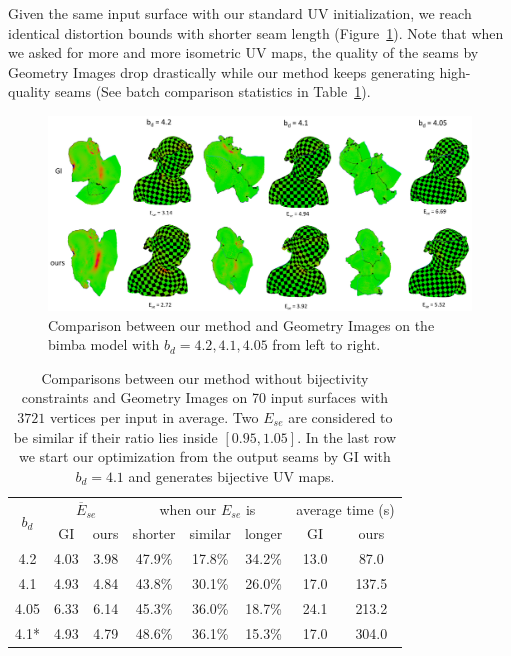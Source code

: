 Given the same input surface with our standard UV initialization, we reach identical distortion bounds with shorter seam length (Figure~\ref{fig:comp_GI}). Note that when we asked for more and more isometric UV maps, the quality of the seams by Geometry Images drop drastically while our method keeps generating high-quality seams (See batch comparison statistics in Table~\ref{tb:comp_GI}).

\begin{figure}[!h]
\centering
\includegraphics[width=\linewidth]{fig/comp_GI.png}
\caption{Comparison between our method and Geometry Images on the bimba model with $b_d = 4.2, 4.1, 4.05$ from left to right.}
\label{fig:comp_GI}
\end{figure}

\begin{table}[!h]
\centering
\caption{Comparisons between our method without bijectivity constraints and Geometry Images on 70 input surfaces with $3721$ vertices per input in average. Two $E_{se}$ are considered to be similar if their ratio lies inside $[0.95, 1.05]$. In the last row we start our optimization from the output seams by GI with $b_d = 4.1$ and generates bijective UV maps.} 
\label{tb:comp_GI}
\begin{tabular}{@{}cccccccc@{}}
\toprule
\multirow{2}{*}{$b_d$} & \multicolumn{2}{c}{$\overline{E}_{se}$}             & \multicolumn{3}{c}{when our $E_{se}$ is}                         & \multicolumn{2}{c}{average time (s)}       \\ \cmidrule(l){2-8} 
                   & GI & ours & shorter & similar & longer & GI & ours \\ \midrule
4.2                & 4.03             & 3.98           &  47.9\%  & 17.8\%  & 34.2\% & 13.0          & 87.0        \\
4.1                & 4.93             & 4.84           &  43.8\%  & 30.1\%  & 26.0\% & 17.0        & 137.5        \\
4.05               & 6.33             & 6.14           &  45.3\%  & 36.0\%  & 18.7\% &  24.1        & 213.2        \\ 
4.1*               & 4.93             & 4.79           &  48.6\%  & 36.1\%  & 15.3\% &  17.0        & 304.0        \\ \bottomrule
\end{tabular}
\end{table}

